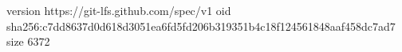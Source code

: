 version https://git-lfs.github.com/spec/v1
oid sha256:c7dd8637d0d618d3051ea6fd5fd206b319351b4c18f124561848aaf458dc7ad7
size 6372

